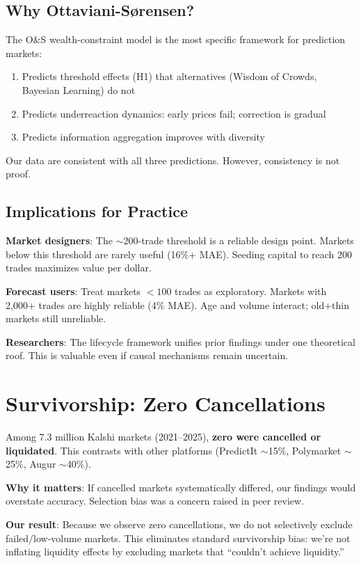 \documentclass[a4paper,11pt]{article}
\theoremstyle{plain}
\theoremstyle{definition}
\begin{document}
\subsection{Why Ottaviani-Sørensen?}

The O\&S wealth-constraint model is the most specific framework for prediction markets:
\begin{enumerate}
\item Predicts threshold effects (H1) that alternatives (Wisdom of Crowds, Bayesian Learning) do not
\item Predicts underreaction dynamics: early prices fail; correction is gradual
\item Predicts information aggregation improves with diversity
\end{enumerate}

Our data are consistent with all three predictions. However, consistency is not proof.

\subsection{Implications for Practice}

\textbf{Market designers}: The $\sim$200-trade threshold is a reliable design point. Markets below this threshold are rarely useful (16\%+ MAE). Seeding capital to reach 200 trades maximizes value per dollar.

\textbf{Forecast users}: Treat markets $<100$ trades as exploratory. Markets with 2,000+ trades are highly reliable (4\% MAE). Age and volume interact; old+thin markets still unreliable.

\textbf{Researchers}: The lifecycle framework unifies prior findings under one theoretical roof. This is valuable even if causal mechanisms remain uncertain.

\section{Survivorship: Zero Cancellations}
\label{sec:survivorship}

Among 7.3 million Kalshi markets (2021--2025), \textbf{zero were cancelled or liquidated}. This contrasts with other platforms (PredictIt $\sim$15\%, Polymarket $\sim$25\%, Augur $\sim$40\%).

\textbf{Why it matters}: If cancelled markets systematically differed, our findings would overstate accuracy. Selection bias was a concern raised in peer review.

\textbf{Our result}: Because we observe zero cancellations, we do not selectively exclude failed/low-volume markets. This eliminates standard survivorship bias: we're not inflating liquidity effects by excluding markets that ``couldn't achieve liquidity.''
\end{document}
